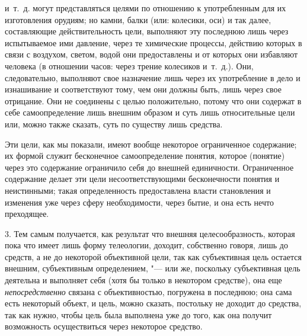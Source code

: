 {{и~т.~д. могут представляться целями по отношению к употребленным для их
изготовления орудиям; но камни, балки (или: колесики, оси) и так далее,
составляющие действительность цели, выполняют эту последнюю лишь через
испытываемое ими давление, через те химические процессы, действию которых в
связи с воздухом, светом, водой они предоставлены и от которых они
избавляют человека (в отношении часов: через трение колесиков и~т.~д.).
Они, следовательно, выполняют свое назначение лишь через их употребление в
дело и изнашивание и соответствуют тому, чем они должны быть, лишь через
свое отрицание. Они не соединены с целью положительно, потому что они
содержат в себе самоопределение лишь внешним образом и суть лишь
относительные цели или, можно также сказать, суть по существу лишь
средства.

Эти цели, как мы показали, имеют вообще некоторое ограниченное
содержание; их формой служит бесконечное самоопределение понятия, которое
(понятие) через это содержание ограничило себя до внешней единичности.
Ограниченное содержание делает эти цели несоответствующими бесконечности
понятия и неистинными; такая определенность предоставлена власти
становления и изменения уже через сферу необходимости, через бытие, и она
есть нечто преходящее.

3. Тем самым получается, как результат что внешняя
целесообразность, которая пока что имеет лишь форму телеологии, доходит,
собственно говоря, лишь до средств, а не до некоторой объективной цели, так
как субъективная цель остается внешним, субъективным определением, "---
или же, поскольку субъективная цель деятельна и выполняет
себя (хотя бы только в некотором средстве), она еще
{\em непосредственно}
связана с объективностью, погружена в последнюю; она сама
есть некоторый объект, и цель, можно сказать, постольку не доходит до
средства, так как нужно, чтобы цель была выполнена уже до того, как она
получит возможность осуществиться через некоторое средство.

}}
